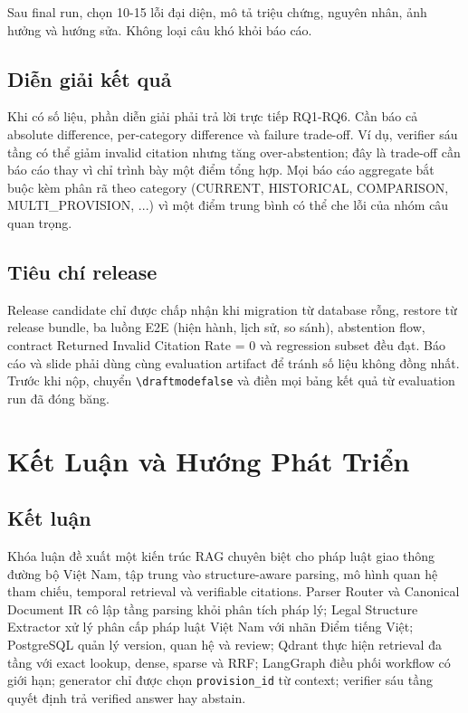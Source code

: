 \documentclass[a4paper,12pt]{extreport}
\newif\ifdraftmode
\newcommand{\pendingresult}[1]{%
  \ifdraftmode
  \begin{center}
  \fcolorbox{DraftBorder}{DraftYellow}{%
    \parbox{0.90\textwidth}{\textbf{Nội dung chờ cập nhật:} #1}
  }
  \end{center}
  \else
  #1
  \fi
}
\newcommand{\code}[1]{\texttt{#1}}
\begin{document}
\pendingresult{Sau final run, chọn 10-15 lỗi đại diện, mô tả triệu chứng, nguyên nhân, ảnh hưởng và hướng sửa. Không loại câu khó khỏi báo cáo.}

\section{Diễn giải kết quả}

Khi có số liệu, phần diễn giải phải trả lời trực tiếp RQ1-RQ6. Cần báo cả absolute difference, per-category difference và failure trade-off. Ví dụ, verifier sáu tầng có thể giảm invalid citation nhưng tăng over-abstention; đây là trade-off cần báo cáo thay vì chỉ trình bày một điểm tổng hợp. Mọi báo cáo aggregate bắt buộc kèm phân rã theo category (CURRENT, HISTORICAL, COMPARISON, MULTI\_PROVISION, ...) vì một điểm trung bình có thể che lỗi của nhóm câu quan trọng.

\section{Tiêu chí release}

Release candidate chỉ được chấp nhận khi migration từ database rỗng, restore từ release bundle, ba luồng E2E (hiện hành, lịch sử, so sánh), abstention flow, contract Returned Invalid Citation Rate = 0 và regression subset đều đạt. Báo cáo và slide phải dùng cùng evaluation artifact để tránh số liệu không đồng nhất. Trước khi nộp, chuyển \code{\textbackslash draftmodefalse} và điền mọi bảng kết quả từ evaluation run đã đóng băng.

\chapter{Kết Luận và Hướng Phát Triển}

\section{Kết luận}

Khóa luận đề xuất một kiến trúc RAG chuyên biệt cho pháp luật giao thông đường bộ Việt Nam, tập trung vào structure-aware parsing, mô hình quan hệ tham chiếu, temporal retrieval và verifiable citations. Parser Router và Canonical Document IR cô lập tầng parsing khỏi phân tích pháp lý; Legal Structure Extractor xử lý phân cấp pháp luật Việt Nam với nhãn Điểm tiếng Việt; PostgreSQL quản lý version, quan hệ và review; Qdrant thực hiện retrieval đa tầng với exact lookup, dense, sparse và RRF; LangGraph điều phối workflow có giới hạn; generator chỉ được chọn \code{provision\_id} từ context; verifier sáu tầng quyết định trả verified answer hay abstain.
\end{document}
